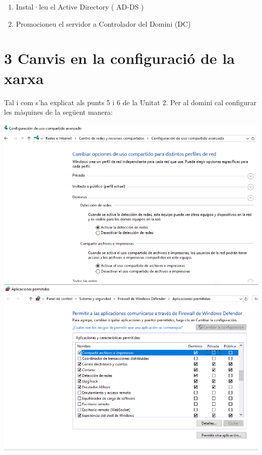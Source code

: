 \documentclass[
  a4paper,
]{article}
\providecommand{\tightlist}{%
  \setlength{\itemsep}{0pt}\setlength{\parskip}{0pt}}
\begin{document}
\begin{enumerate}
\def\labelenumi{\arabic{enumi}.}
\tightlist
\item
  Instal·leu el Active Directory ( AD-DS )
\item
  Promocioneu el servidor a Controlador del Domini (DC)
\end{enumerate}

\section{3 Canvis en la configuració de la
xarxa}\label{canvis-en-la-configuraciuxf3-de-la-xarxa}

Tal i com s'ha explicat als punts 5 i 6 de la Unitat 2. Per al domini
cal configurar les màquines de la següent manera:

\includegraphics{png/OpcionesDeteccionRedesDominio.png}
\includegraphics{png/FirewallAplicacionesAD.png}
\end{document}
